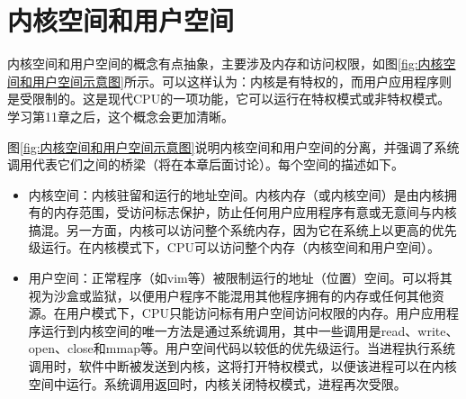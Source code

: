 \documentclass[lang=cn,newtx,10pt,scheme=chinese]{elegantbook}
\begin{document}
\section{内核空间和用户空间}

内核空间和用户空间的概念有点抽象，主要涉及内存和访问权限，如图\ref{fig:内核空间和用户空间示意图}所示。可以这样认为：内核是有特权的，而用户应用程序则是受限制的。这是现代CPU的一项功能，它可以运行在特权模式或非特权模式。学习第11章之后，这个概念会更加清晰。

图\ref{fig:内核空间和用户空间示意图}说明内核空间和用户空间的分离，并强调了系统调用代表它们之间的桥梁（将在本章后面讨论）。每个空间的描述如下。

\begin{itemize}
    \item 内核空间：内核驻留和运行的地址空间。内核内存（或内核空间）是由内核拥有的内存范围，受访问标志保护，防止任何用户应用程序有意或无意间与内核搞混。另一方面，内核可以访问整个系统内存，因为它在系统上以更高的优先级运行。在内核模式下，CPU可以访问整个内存（内核空间和用户空间）。
    \item 用户空间：正常程序（如vim等）被限制运行的地址（位置）空间。可以将其视为沙盒或监狱，以便用户程序不能混用其他程序拥有的内存或任何其他资源。在用户模式下，CPU只能访问标有用户空间访问权限的内存。用户应用程序运行到内核空间的唯一方法是通过系统调用，其中一些调用是read、write、open、close和mmap等。用户空间代码以较低的优先级运行。当进程执行系统调用时，软件中断被发送到内核，这将打开特权模式，以便该进程可以在内核空间中运行。系统调用返回时，内核关闭特权模式，进程再次受限。
\end{itemize}
\end{document}

